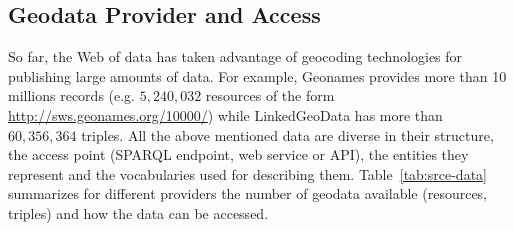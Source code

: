 \documentclass[a4paper,11pt]{report}
\begin{document}
\subsection{Geodata Provider and Access}
So far, the Web of data has taken advantage of geocoding technologies for publishing large amounts of data. For example, Geonames provides more than 10 millions records (e.g. $5,240,032$ resources of the form \url{http://sws.geonames.org/10000/}) while LinkedGeoData has more than $60,356,364$ triples. All the above mentioned data are diverse in their structure, the access point (SPARQL endpoint, web service or API), the entities they represent and the vocabularies used for describing them. Table~\ref{tab:srce-data} summarizes for different providers the number of geodata available (resources, triples) and how the data can be accessed.
\begin{table}[!htbp]
\end{table}
\end{document}
